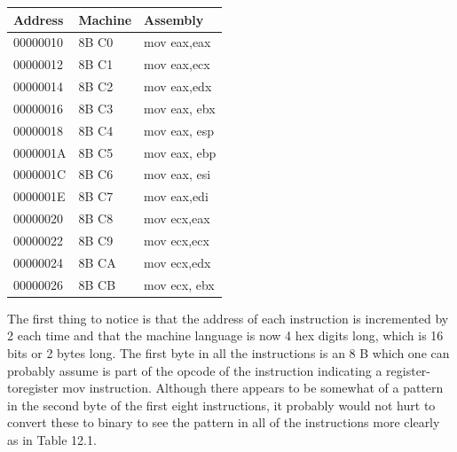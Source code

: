 \documentclass[10pt]{article}
\begin{document}
\begin{center}
\begin{tabular}{|l|l|l|}
\hline
Address & Machine & Assembly \\
\hline
00000010 & 8B C0 & mov eax,eax \\
\hline
00000012 & 8B C1 & mov eax,ecx \\
\hline
00000014 & 8B C2 & mov eax,edx \\
\hline
00000016 & 8B C3 & mov eax, ebx \\
\hline
00000018 & 8B C4 & mov eax, esp \\
\hline
0000001A & 8B C5 & mov eax, ebp \\
\hline
0000001C & 8B C6 & mov eax, esi \\
\hline
0000001E & 8B C7 & mov eax,edi \\
\hline
00000020 & 8B C8 & mov ecx,eax \\
\hline
00000022 & 8B C9 & mov ecx,ecx \\
\hline
00000024 & 8B CA & mov ecx,edx \\
\hline
00000026 & 8B CB & mov ecx, ebx \\
\hline
\end{tabular}
\end{center}

The first thing to notice is that the address of each instruction is incremented by 2 each time and that the machine language is now 4 hex digits long, which is 16 bits or 2 bytes long. The first byte in all the instructions is an 8 B which one can probably assume is part of the opcode of the instruction indicating a register-toregister mov instruction. Although there appears to be somewhat of a pattern in the second byte of the first eight instructions, it probably would not hurt to convert these to binary to see the pattern in all of the instructions more clearly as in Table 12.1.
\end{document}
